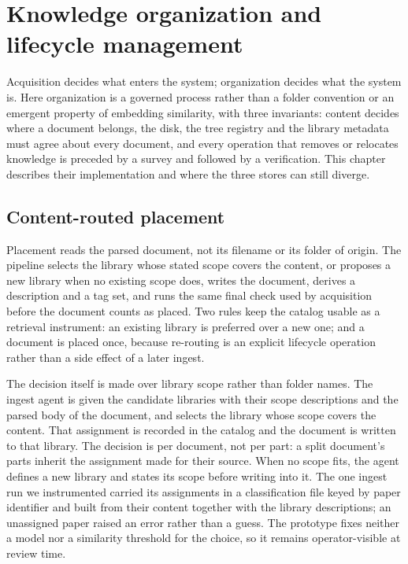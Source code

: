 \section{Knowledge organization and lifecycle management}
\label{sec:organization}

Acquisition decides what enters the system; organization decides what the
system is. Here organization is a governed process rather than a folder
convention or an emergent property of embedding similarity, with three
invariants: content decides where a document belongs, the disk, the tree
registry and the library metadata must agree about every document, and every
operation that removes or relocates knowledge is preceded by a survey and
followed by a verification. This chapter describes their implementation and
where the three stores can still diverge.

\subsection{Content-routed placement}
\label{sec:org-placement}

Placement reads the parsed document, not its filename or its folder of
origin. The pipeline selects the library whose stated scope covers the
content, or proposes a new library when no existing scope does, writes the
document, derives a description and a tag set, and runs the same final check
used by acquisition before the document counts as placed. Two rules keep the
catalog usable as a retrieval instrument: an existing library is preferred
over a new one; and a document is placed once, because re-routing is an
explicit lifecycle operation rather than a side effect of a later ingest.

The decision itself is made over library scope rather than folder names. The
ingest agent is given the candidate libraries with their scope descriptions and
the parsed body of the document, and selects the library whose scope covers the
content. That assignment is recorded in the catalog and the document is written
to that library. The decision is per document, not per part: a split document's
parts inherit the assignment made for their source. When no scope fits, the
agent defines a new library and states its scope before writing into it. The one
ingest run we instrumented carried its assignments in a classification file
keyed by paper identifier and built from their content together with the library
descriptions; an unassigned paper raised an error rather than a guess. The
prototype fixes neither a model nor a similarity threshold for the choice, so it
remains operator-visible at review time.

